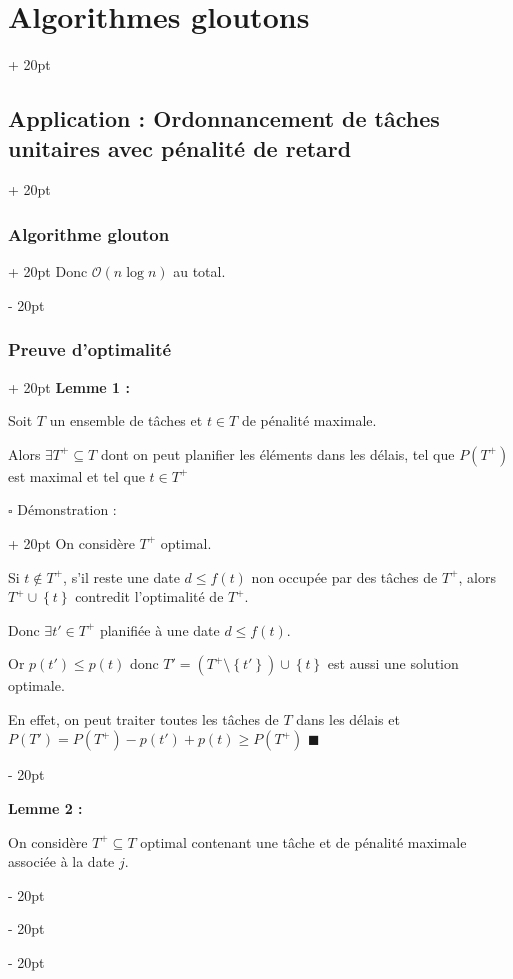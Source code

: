\documentclass[a4paper, 12pt, twoside]{article}
\newcommand{\set}[1]{\left\{ #1 \right\}}
\renewcommand{\le}{\leqslant}
\renewcommand{\ge}{\geqslant}
\newcommand{\ind}[1][20pt]{\advance\leftskip + #1}
\newcommand{\deind}[1][20pt]{\advance\leftskip - #1}
\newenvironment{indt}[2][20pt]{#2 \par \ind[#1]}{\par \deind} %
\begin{document}
\begin{indt}{\section{Algorithmes gloutons}}
\begin{indt}{\subsection{Application : Ordonnancement de tâches unitaires avec pénalité de retard}}
\begin{indt}{\subsubsection{Algorithme glouton}}
                Donc $\mathcal O(n \log n)$ au total.
            \end{indt}
            
            \vspace{12pt}
            
            \begin{indt}{\subsubsection{Preuve d'optimalité}}
                \textbf{Lemme 1 :}
                \begin{pseudocode}
                    Soit $T$ un ensemble de tâches et $t \in T$ de pénalité maximale.
                    
                    Alors $\exists T^+ \subseteq T$ dont on peut planifier les éléments dans les délais, tel que $P(T^+)$ est maximal et tel que $t \in T^+$
                \end{pseudocode}
                
                \vspace{12pt}
                
                \begin{indt}{$\square$ Démonstration :}
                    On considère $T^+$ optimal.
                    
                    Si $t \not \in T^+$, s'il reste une date $d \le f(t)$ non occupée par des tâches de $T^+$, alors $T^+ \cup \set t$ contredit l'optimalité de $T^+$.
                    
                    Donc $\exists t' \in T^+$ planifiée à une date $d \le f(t)$.
                    
                    Or $p(t') \le p(t)$ donc $T' = (T^+ \setminus \set{t'}) \cup \set t$ est aussi une solution optimale.
                    
                    En effet, on peut traiter toutes les tâches de $T$ dans les délais et $P(T') = P(T^+) - p(t') + p(t) \ge P(T^+)$
                    $\blacksquare$
                \end{indt}
                
                \vspace{12pt}
                
                \textbf{Lemme 2 :}
                \begin{pseudocode}
                    On considère $T^+ \subseteq T$ optimal contenant une tâche et de pénalité maximale associée à la date $j$.
                    

\end{pseudocode}
\end{indt}
\end{indt}
\end{indt}
\end{document}
